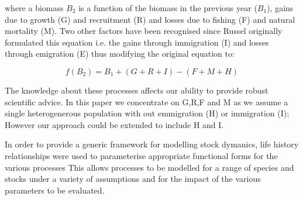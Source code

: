 \documentclass[%
nonumbib,      %
%
]{nrc1}                          %
\begin{document}
where a biomass $B_2$ is a function of the biomass in the previous year ($B_1$), gains due to growth (G) and recruitment (R) and losses due to 
fishing (F) and natural mortality (M). Two other factors have been recognised since Russel originally formulated this equation i.e. 
the gains through immigration (I) and losses through emigration (E) thus modifying the original equation to:

\begin{equation}f(B_2) = B_1 + (G+R+I) - (F+M+H)\end{equation}

The knowledge about these processes affects our ability to provide robust scientific advice. In this paper we concentrate 
on G,R,F and M as we assume a single heterogenerous population with out emmigration (H) or immigration (I); However our approach could be extended to include H and I.

In order to provide a generic framework for modelling stock dymanics, life history relationships were used to parameterise appropriate functional forms for 
the various processes  This allows processes to be modelled for a range of species and stocks under a variety of assumptions and for the impact of the various parameters
to be evaluated.  
\end{document}
